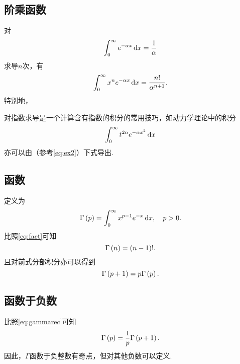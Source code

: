 \documentclass[UTF-8]{ctexart}
\begin{document}
  \subsection{阶乘函数}
  对
  \[ \int_0^\infty e^{-\alpha x} \, \mathrm{d} x = \frac{1}{\alpha} \]
  求导$n$次，有
  \[ \int_0^\infty x^n e^{-\alpha x} \, \mathrm{d} x = \frac{n!}{\alpha^{n+1}}. \]
  特别地，
  \par
  对指数求导是一个计算含有指数的积分的常用技巧，如动力学理论中的积分
  \[ \int_0^\infty t^{2n} e^{-\alpha x^2} \, \mathrm{d} x \]
  亦可以由（参考\ref{eq:ex2}）下式导出.
  \subsection{\titlegamma 函数}
  定义为
  \[ \Gamma\left(p\right) = \int_0^\infty x^{p-1}e^{-x}\, \mathrm{d} x, \quad p>0. \]
  比照\ref{eq:fact}可知
  \begin{equation}
    \label{eq:gammarec}
    \Gamma\left(n\right) = \left(n-1\right)!.
  \end{equation}
  且对前式分部积分亦可以得到
  \[ \Gamma\left(p+1\right) = p\Gamma\left(p\right). \]
  \subsection{\titlegamma 函数于负数}
  比照\ref{eq:gammarec}可知
  \[ \Gamma\left(p\right) = \frac{1}{p}\Gamma\left(p+1\right). \]
  因此，$\Gamma$函数于负整数有奇点，但对其他负数可以定义.
\end{document}

